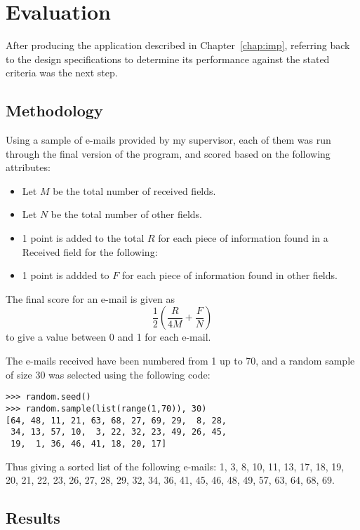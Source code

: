 \chapter{Evaluation}\label{chap:test}
After producing the application described in Chapter~\ref{chap:imp}, referring back to the design specifications to determine its performance against the stated criteria was the next step.
\section{Methodology}
Using a sample of e-mails provided by my supervisor, each of them was run through the final version of the program, and scored based on the following attributes:

\begin{itemize}
\item Let $M$ be the total number of received fields.
\item Let $N$ be the total number of other fields.
\item 1 point is added to the total $R$ for each piece of information found in a Received field for the following:
\item 1 point is addded to $F$ for each piece of information found in other fields.
\end{itemize}

The final score for an e-mail is given as \[\frac12\left(\frac R{4M}+\frac FN\right)\]to give a value between 0 and 1 for each e-mail.

The e-mails received have been numbered from 1 up to 70, and a random sample of size 30 was selected using the following code:

\begin{verbatim}
>>> random.seed()
>>> random.sample(list(range(1,70)), 30)
[64, 48, 11, 21, 63, 68, 27, 69, 29,  8, 28,
 34, 13, 57, 10,  3, 22, 32, 23, 49, 26, 45,
 19,  1, 36, 46, 41, 18, 20, 17]
\end{verbatim}

Thus giving a sorted list of the following e-mails: 1, 3, 8, 10, 11, 13, 17, 18, 19, 20, 21, 22, 23, 26, 27, 28, 29, 32, 34, 36, 41, 45, 46, 48, 49, 57, 63, 64, 68, 69.

\section{Results}

